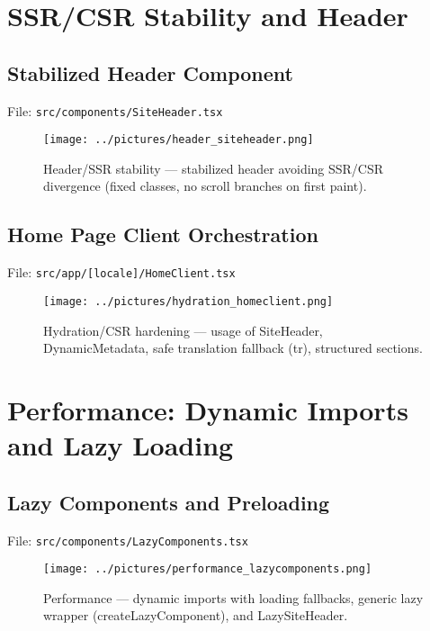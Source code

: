 \documentclass[11pt,a4paper]{article}
\begin{document}
\section{SSR/CSR Stability and Header}
\subsection*{Stabilized Header Component}
\noindent File: \texttt{src/components/SiteHeader.tsx}

\begin{figure}[h!]
  \centering
  \texttt{[image: ../pictures/header\_siteheader.png]}
  \caption{Header/SSR stability — stabilized header avoiding SSR/CSR divergence (fixed classes, no scroll branches on first paint).}
\end{figure}



\subsection*{Home Page Client Orchestration}
\noindent File: \texttt{src/app/[locale]/HomeClient.tsx}

\begin{figure}[h!]
  \centering
  \texttt{[image: ../pictures/hydration\_homeclient.png]}
  \caption{Hydration/CSR hardening — usage of SiteHeader, DynamicMetadata, safe translation fallback (tr), structured sections.}
\end{figure}



\section{Performance: Dynamic Imports and Lazy Loading}
\subsection*{Lazy Components and Preloading}
\noindent File: \texttt{src/components/LazyComponents.tsx}

\begin{figure}[h!]
  \centering
  \texttt{[image: ../pictures/performance\_lazycomponents.png]}
  \caption{Performance — dynamic imports with loading fallbacks, generic lazy wrapper (createLazyComponent), and LazySiteHeader.}
\end{figure}
\end{document}
